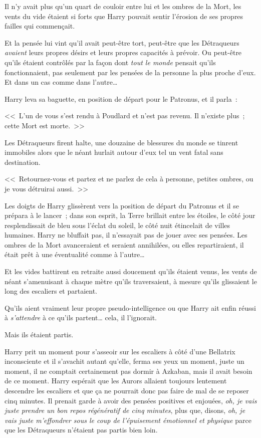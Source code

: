 Il n'y avait plus qu'un quart de couloir entre lui et les ombres de la Mort, les vents du vide étaient si forts que Harry pouvait sentir l'érosion de ses propres failles qui commençait.

Et la pensée lui vint qu'il avait peut-être tort, peut-être que les Détraqueurs \emph{avaient} leurs propres désirs et leurs propres capacités à prévoir. Ou peut-être qu'ils étaient contrôlés par la façon dont \emph{tout le monde} pensait qu'ils fonctionnaient, pas seulement par les pensées de la personne la plus proche d'eux. Et dans un cas comme dans l'autre…

Harry leva sa baguette, en position de départ pour le Patronus, et il parla~:

<<~L'un de vous s'est rendu à Poudlard et n'est pas revenu. Il n'existe plus~; cette Mort est morte.~>>

Les Détraqueurs firent halte, une douzaine de blessures du monde se tinrent immobiles alors que le néant hurlait autour d'eux tel un vent fatal sans destination.

<<~Retournez-vous et partez et ne parlez de cela à personne, petites ombres, ou je vous détruirai aussi.~>>

Les doigts de Harry glissèrent vers la position de départ du Patronus et il se prépara à le lancer~; dans son esprit, la Terre brillait entre les étoiles, le côté jour resplendissait de bleu sous l'éclat du soleil, le côté nuit étincelait de villes humaines. Harry ne bluffait pas, il n'essayait pas de jouer avec ses pensées. Les ombres de la Mort avanceraient et seraient annihilées, ou elles repartiraient, il était prêt à une éventualité comme à l'autre…

Et les vides battirent en retraite aussi doucement qu'ils étaient venus, les vents de néant s'amenuisant à chaque mètre qu'ils traversaient, à mesure qu'ils glissaient le long des escaliers et partaient.

Qu'ils aient vraiment leur propre pseudo-intelligence ou que Harry ait enfin réussi à \emph{s'attendre} à ce qu'ils partent… cela, il l'ignorait.

Mais ils étaient partis.

Harry prit un moment pour s'asseoir sur les escaliers à côté d'une Bellatrix inconsciente et il s'avachit autant qu'elle, ferma ses yeux un moment, juste un moment, il ne comptait certainement pas dormir à Azkaban, mais il avait besoin de ce moment. Harry espérait que les Aurors allaient toujours lentement descendre les escaliers et que ça ne pourrait donc pas faire de mal de se reposer cinq minutes. Il prenait garde à avoir des pensées positives et enjouées, \emph{oh, je vais juste prendre un bon repos régénératif de cinq minutes}, plus que, disons, \emph{oh, je vais juste m'effondrer sous le coup de l'épuisement émotionnel et physique} parce que les Détraqueurs n'étaient pas partis bien loin.

